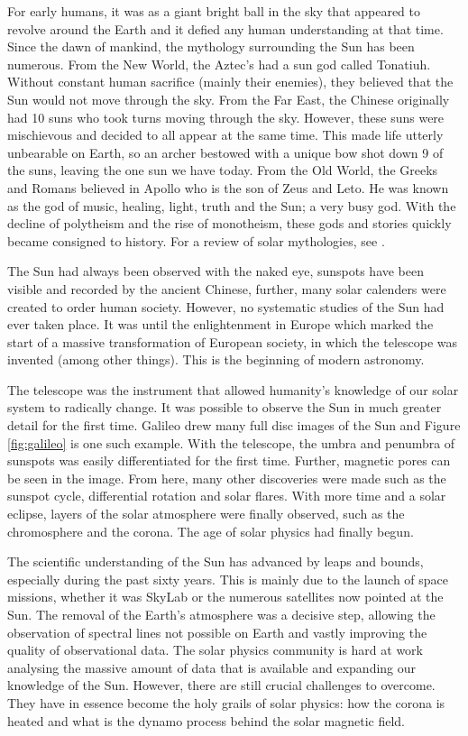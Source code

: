     For early humans, it was as a giant bright ball in the sky that appeared to revolve around the Earth and it defied any human understanding at that time.
    Since the dawn of mankind, the mythology surrounding the Sun has been numerous.    
    From the New World, the Aztec's had a sun god called Tonatiuh. 
    Without constant human sacrifice (mainly their enemies), they believed that the Sun would not move through the sky.
    From the Far East, the Chinese originally had 10 suns who took turns moving through the sky. 
    However, these suns were mischievous and decided to all appear at the same time. 
    This made life utterly unbearable on Earth, so an archer bestowed with a unique bow shot down 9 of the suns, leaving the one sun we have today.
    From the Old World, the Greeks and Romans believed in Apollo who is the son of Zeus and Leto.
    He was known as the god of music, healing, light, truth and the Sun; a very busy god.
    With the decline of polytheism and the rise of monotheism, these gods and stories quickly became consigned to history. 
    For a review of solar mythologies, see \citet{mythbook}.
    
    The Sun had always been observed with the naked eye, sunspots have been visible and recorded by the ancient Chinese, further, many solar calenders were created to order human society.
    However, no systematic studies of the Sun had ever taken place.
    It was until the enlightenment in Europe which marked the start of a massive transformation of European society, in which the telescope was invented (among other things).
    This is the beginning of modern astronomy.
    
    The telescope was the instrument that allowed humanity's knowledge of our solar system to radically change.
    It was possible to observe the Sun in much greater detail for the first time.
    Galileo drew many full disc images of the Sun and Figure \ref{fig:galileo} is one such example. 
    With the telescope, the umbra and penumbra of sunspots was easily differentiated for the first time.
    Further, magnetic pores can be seen in the image.
    From here, many other discoveries were made such as the sunspot cycle, differential rotation and solar flares.
    With more time and a solar eclipse, layers of the solar atmosphere were finally observed, such as the chromosphere and the corona.
    The age of solar physics had finally begun.
    
    The scientific understanding of the Sun has advanced by leaps and bounds, especially during the past sixty years.
    This is mainly due to the launch of space missions, whether it was SkyLab or the numerous satellites now pointed at the Sun.
    The removal of the Earth's atmosphere was a decisive step, allowing the observation of spectral lines not possible on Earth and vastly improving the quality of observational data.
    The solar physics community is hard at work analysing the massive amount of data that is available and expanding our knowledge of the Sun.   
    However, there are still crucial challenges to overcome.
    They have in essence become the holy grails of solar physics: how the corona is heated and what is the dynamo process behind the solar magnetic field.

